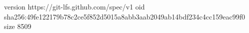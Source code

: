 version https://git-lfs.github.com/spec/v1
oid sha256:49fe122179b78c2ce5f852d5015a8abb3aab2049ab14bdf234c4cc159eac99f0
size 8509
